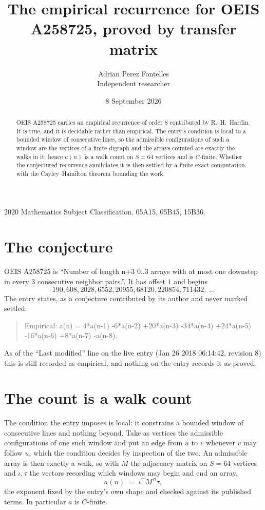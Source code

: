 \documentclass[11pt,a4paper]{article}
\title{The empirical recurrence for OEIS A258725, proved by transfer matrix}
\author{Adrian Perez Fontelles\\ \small Independent researcher}
\date{8 September 2026}
\theoremstyle{plain}
\theoremstyle{definition}
\begin{document}
\maketitle

\begin{abstract}
OEIS A258725 carries an empirical recurrence of order $8$ contributed by R.~H.~Hardin. It is
true, and it is decidable rather than empirical. The entry's condition is local to a bounded window of consecutive lines, so
the admissible configurations of such a window are the vertices of a finite digraph and the
arrays counted are exactly the walks in it; hence $a(n)$ is a walk count on $S=64$ vertices
and is $C$-finite. Whether the conjectured recurrence annihilates it is then settled by a
finite exact computation, with the Cayley--Hamilton theorem bounding the work.
\end{abstract}

\noindent\small 2020 Mathematics Subject Classification. 05A15, 05B45, 15B36.\normalsize

\section{The conjecture}

OEIS A258725 is ``Number of length n+3 0..3 arrays with at most one downstep in every 3 consecutive neighbor pairs.''. It has offset $1$ and begins
\[
190, 608, 2028, 6552, 20955, 68120, 220854, 711432,\ \dots
\]
The entry states, as a conjecture contributed by its author and never marked settled:
\begin{quote}
Empirical: a(n) = 4*a(n-1) -6*a(n-2) +20*a(n-3) -34*a(n-4) +24*a(n-5) -16*a(n-6) +8*a(n-7) -a(n-8).
\end{quote}
As of the ``Last modified'' line on the live entry (Jan 26 2018 06:14:42, revision 8) this is still
recorded as empirical, and nothing on the entry records it as proved.

\section{The count is a walk count}

The condition the entry imposes is local: it constrains a bounded window of consecutive lines and nothing beyond. Take as
vertices the admissible configurations of one such window and put an edge from $u$ to $v$
whenever $v$ may follow $u$, which the condition decides by inspection of the two. An
admissible array is then exactly a walk, so with $M$ the adjacency matrix on $S=64$ vertices
and $\iota,\tau$ the vectors recording which windows may begin and end an array,
\[
a(n)\;=\;\iota^{\!\top}M^{\,n}\tau ,
\]
the exponent fixed by the entry's own shape and checked against its published terms. In
particular $a$ is $C$-finite.
\end{document}
